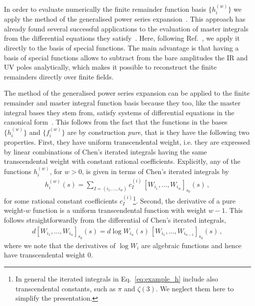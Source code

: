 \documentclass[main.tex]{subfiles}
\begin{document}
In order to evaluate numerically the finite remainder function basis $\{h^{(w)}_i\}$ we apply the method of the generalised power series expansion~\cite{Francesco:2019yqt}. This approach has already found several successful applications to the evaluation of master integrals from the differential equations they satisfy~\cite{Francesco:2019yqt,Bonciani:2019jyb,Frellesvig:2019byn,Abreu:2020jxa,Becchetti:2020wof,Bonciani:2021zzf,abreu2021twoloop}. Here, following Ref.~\cite{Badger:2021nhg}, we apply it directly to the basis of special functions. The main advantage is that having a basis of special functions allows to subtract from the bare amplitudes the IR and UV poles analytically, which makes it possible to reconstruct the finite remainders directly over finite fields. 

The method of the generalised power series expansion can be applied to the finite remainder and master integral function basis because they too, like the master integral bases they stem from, satisfy systems of differential equations in the canonical form~\cite{Henn:2013pwa}. This follows from the fact that the functions in the bases $\{h^{(w)}_i\}$ and $\{f^{(w)}_i\}$ are by construction \textit{pure}, that is they have the following two properties. First, they have uniform transcendental weight, i.e. they are expressed by linear combinations of Chen's iterated integrals having the same transcendental weight with constant rational coefficients. Explicitly, any of the functions $h^{(w)}_i$, for $w>0$, is given in terms of Chen's iterated integrals by
\begin{align} \label{eq:example_h}
h^{(w)}_{i}(s) = \sum_{I = (i_1,\ldots,i_w)} c_I^{(i)} \, \left[W_{i_1}, \ldots, W_{i_w}  \right]_{s_0} (s) \, ,
\end{align}
for some rational constant coefficients $c_I^{(i)}$\footnote{In general the iterated integrals in Eq.~\eqref{eq:example_h} include also transcendental constants, such as $\pi$ and $\zeta(3)$. We neglect them here to simplify the presentation.}.
Second, the derivative of a pure weight-$w$ function is a uniform transcendental function with weight $w-1$. This follows straightforwardly from the differential of Chen's iterated integrals,
\begin{align} \label{eq:ChenDerivative}
d \left[W_{i_1}, \ldots, W_{i_n}  \right]_{s_0} (s) = d \log W_{i_n}(s) \, \left[W_{i_1}, \ldots, W_{i_{n-1}}  \right]_{s_0} (s) \,,
\end{align}
where we note that the derivatives of $\log W_i$ are algebraic functions and hence have transcendental weight $0$.
\end{document}
